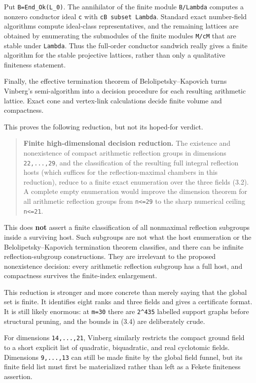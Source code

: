 \documentclass[
  10pt,
]{report}
\newcounter{none} %
\begin{document}
Put \texttt{B=End\_Ok(L\_0)}. The annihilator of the finite module
\texttt{B/Lambda} computes a nonzero conductor ideal \texttt{c} with
\texttt{cB\ subset\ Lambda}. Standard exact number-field algorithms
compute ideal-class representatives, and the remaining lattices are
obtained by enumerating the submodules of the finite modules
\texttt{M/cM} that are stable under \texttt{Lambda}. Thus the full-order
conductor sandwich really gives a finite algorithm for the stable
projective lattices, rather than only a qualitative finiteness
statement.

Finally, the effective termination theorem of Belolipetsky--Kapovich
turns Vinberg's semi-algorithm into a decision procedure for each
resulting arithmetic lattice. Exact cone and vertex-link calculations
decide finite volume and compactness.

This proves the following reduction, but not its hoped-for verdict.

\begin{quote}
\textbf{Finite high-dimensional decision reduction.} The existence and
nonexistence of compact arithmetic reflection groups in dimensions
\texttt{22,...,29}, and the classification of the resulting full
integral reflection hosts (which suffices for the reflection-maximal
chambers in this reduction), reduce to a finite exact enumeration over
the three fields (3.2). A complete empty enumeration would improve the
dimension theorem for all arithmetic reflection groups from
\texttt{n\textless{}=29} to the sharp numerical ceiling
\texttt{n\textless{}=21}.
\end{quote}

This does \textbf{not} assert a finite classification of all nonmaximal
reflection subgroups inside a surviving host. Such subgroups are not
what the host enumeration or the Belolipetsky--Kapovich termination
theorem classifies, and there can be infinite reflection-subgroup
constructions. They are irrelevant to the proposed nonexistence
decision: every arithmetic reflection subgroup has a full host, and
compactness survives the finite-index enlargement.

This reduction is stronger and more concrete than merely saying that the
global set is finite. It identifies eight ranks and three fields and
gives a certificate format. It is still likely enormous: at
\texttt{m=30} there are \texttt{2\^{}435} labelled support graphs before
structural pruning, and the bounds in (3.4) are deliberately crude.

For dimensions \texttt{14,...,21}, Vinberg similarly restricts the
compact ground field to a short explicit list of quadratic, biquadratic,
and real cyclotomic fields. Dimensions \texttt{9,...,13} can still be
made finite by the global field funnel, but its finite field list must
first be materialized rather than left as a Fekete finiteness assertion.
\end{document}

